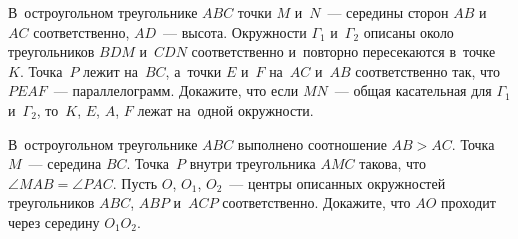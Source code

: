 \begin{problems}
\item
В~остроугольном треугольнике $ABC$ точки $M$ и~$N$~--- середины
сторон $AB$ и~$AC$ соответственно, $AD$~--- высота.
Окружности $\Gamma_1$ и~$\Gamma_2$ описаны около треугольников $BDM$ и~$CDN$
соответственно и~повторно пересекаются в~точке~$K$.
Точка~$P$ лежит на~$BC$, а~точки $E$ и~$F$ на~$AC$ и~$AB$ соответственно так,
что $PEAF$~--- параллелограмм.
Докажите, что если $MN$~--- общая касательная для $\Gamma_1$ и~$\Gamma_2$,
то~$K$, $E$, $A$, $F$ лежат на~одной окружности.

\item
В~остроугольном треугольнике $ABC$ выполнено соотношение $AB > AC$.
Точка~$M$~--- середина $BC$.
Точка~$P$ внутри треугольника $AMC$ такова, что $\angle MAB = \angle PAC$.
Пусть $O$, $O_1$, $O_2$~--- центры описанных окружностей
треугольников $ABC$, $ABP$ и~$ACP$ соответственно.
Докажите, что $AO$ проходит через середину $O_1 O_2$.

\end{problems}

